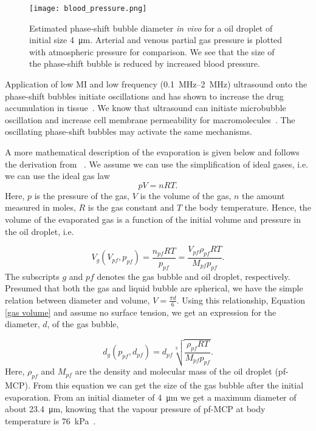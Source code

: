 \begin{figure}[h]
	\centering
	\texttt{[image: blood\_pressure.png]}
	\caption{Estimated phase-shift bubble diameter \textit{in vivo} for a oil droplet of initial size \SI{4}{\micro\meter}. Arterial and venous partial gas pressure is plotted with atmospheric pressure for comparison. We see that the size of the phase-shift bubble is reduced by increased blood pressure.}
	\label{Fig:blood_pressure}
\end{figure}

Application of low MI and low frequency (\SIrange{0.1}{2}{\mega\hertz}) ultrasound onto the phase-shift bubbles initiate oscillations and has shown to increase the drug accumulation in tissue~\cite{wamel2014}. We know that ultrasound can initiate microbubble oscillation and increase cell membrane permeability for macromolecules~\cite{VanWamel2006a}. The oscillating phase-shift bubbles may activate the same mechanisms.

A more mathematical description of the evaporation is given below and follows the derivation from ~\citet{Healey2013}. We assume we can use the simplification of  ideal gases, i.e. we can use the ideal gas law
\begin{equation}
\label{ideal gas law}
 pV = nRT. 
\end{equation}  
Here, $p$ is the pressure of the gas, $V$ is the volume of the gas, $n$ the amount measured in moles, $R$ is the gas constant and $T$ the  body temperature. Hence, the volume of the evaporated gas is a function of the initial volume and pressure in the oil droplet, i.e.

\begin{equation}
\label{gas volume}
V_g(V_{pf}, p_{pf}) = \frac{n_{pf}RT}{p_{pf}}=\frac{V_{pf}\rho_{pf}RT}{M_{pf}p_{pf}}.
\end{equation}
The subscripts $g$ and $pf$ denotes the gas bubble and oil droplet, respectively. Presumed that both the gas and liquid bubble are spherical, we have the simple relation between diameter and volume, $V = \frac{\pi d}{6}$. Using this relationship, Equation \eqref{gas volume} and assume no surface tension, we get an expression for the diameter, $d$, of the gas bubble,  

\begin{equation}
\label{diameter}
d_g(p_{pf}, d_{pf}) = d_{pf}\sqrt[3]{\frac{\rho_{pf}RT}{M_{pf}p_{pf}}}.
\end{equation}
Here, $\rho_{pf}$ and $M_{pf}$ are the density and molecular mass of the oil droplet (pf-MCP). From this equation we can get the size of the gas bubble after the initial evaporation. From an initial diameter of \SI{4}{\micro\metre} we get a maximum diameter of about \SI{23.4}{\micro\metre}, knowing that the vapour pressure of pf-MCP at body temperature is \SI{76}{\kilo\pascal}~\cite{Healey2013}.

